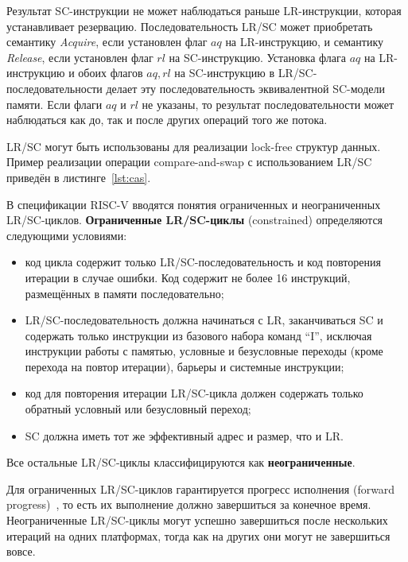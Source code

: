 Результат SC-инструкции не может наблюдаться раньше LR-инструкции,
которая устанавливает резервацию. Последовательность LR/SC может
приобретать семантику \textit{Acquire}, если установлен флаг $aq$ на
LR-инструкцию, и семантику \textit{Release}, если установлен флаг
$rl$ на SC-инструкцию. Установка флага $aq$ на LR-инструкцию и обоих
флагов $aq, rl$ на SC-инструкцию в LR/SC-последовательности делает
эту последовательность эквивалентной SC-модели памяти. Если флаги
$aq$ и $rl$ не указаны, то результат последовательности может
наблюдаться как до, так и после других операций того же потока.

LR/SC могут быть использованы для реализации lock-free структур
данных. Пример реализации операции compare-and-swap с использованием
LR/SC приведён в листинге~\ref{lst:cas}.

\begin{minipage}{\textwidth}
  \centering
  
\end{minipage}

В спецификации RISC-V вводятся понятия ограниченных и неограниченных
LR/SC-циклов. \textbf{Ограниченные LR/SC-циклы} (constrained) определяются
следующими условиями:
\begin{itemize}
  \item код цикла содержит только LR/SC-последовательность и код
    повторения итерации в случае ошибки. Код содержит не более 16
    инструкций, размещённых в памяти последовательно;
  \item LR/SC-последовательность должна начинаться с LR,
    заканчиваться SC и содержать только инструкции из базового набора
    команд ``I'', исключая инструкции работы с памятью, условные и
    безусловные переходы (кроме перехода на повтор итерации), барьеры
    и системные инструкции;
  \item код для повторения итерации LR/SC-цикла должен содержать
    только обратный условный или безусловный переход;
  \item SC должна иметь тот же эффективный адрес и размер, что и LR.
\end{itemize}
Все остальные LR/SC-циклы классифицируются как \textbf{неограниченные}.

Для ограниченных LR/SC-циклов гарантируется прогресс исполнения
(forward progress)~\cite{scott2024architectural}, то есть их
выполнение должно завершиться за конечное время. Неограниченные
LR/SC-циклы могут успешно завершиться после нескольких итераций на
одних платформах, тогда как на других они могут не завершиться вовсе.


